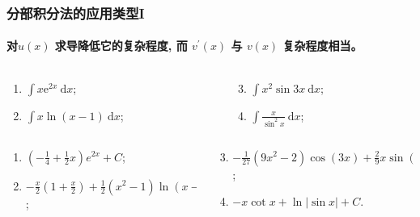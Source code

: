 \documentclass[
10pt,
aspectratio=43,
]{beamer}
\begin{document}
\begin{frame}
	\frametitle{分部积分法的应用类型I}
	\framesubtitle{对$u(x)$ 求导降低它的复杂程度, 而 $v^{\prime}(x)$ 与 $v(x)$ 复杂程度相当。}
	\everymath{\displaystyle}
	\begin{block}{}
		\begin{columns}[onlytextwidth]
			\begin{column}{0.5\textwidth}
				\begin{enumerate}
					\item $\int x \mathrm{e}^{2 x} \mathrm{~d} x$;
					\item $\int x \ln (x-1) \mathrm{~d} x$;
				\end{enumerate}
			\end{column}
			\begin{column}{0.5\textwidth}
				\begin{enumerate}
					\setcounter{enumi}{2}
					\item $\int x^2 \sin 3 x \mathrm{~d} x$;
					\item $\int \frac{x}{\sin ^2 x} \mathrm{~d} x$;
				\end{enumerate}
			\end{column}
		\end{columns}
	\end{block}
	\pause
	\begin{exampleblock}{}
		\begin{columns}[onlytextwidth]
			\begin{column}{0.5\textwidth}
				\begin{enumerate}
					\item $\left(-\frac{1}{4}+\frac{1}{2}x\right)e^{2x}+C$;
					\item $-\frac{x}{2}\left(1+\frac{x}{2}\right)+\frac{1}{2}\left(x^2-1\right)\ln(x-1)+C$;
				\end{enumerate}
			\end{column}
			\begin{column}{0.5\textwidth}
				\begin{enumerate}
					\setcounter{enumi}{2}
					\item $-\frac{1}{27} \left(9 x^2-2\right) \cos (3 x)+\frac{2}{9} x \sin (3 x)+C$;
					\item $-x\cot x+\ln|\sin x|+C$.
				\end{enumerate}
			\end{column}
		\end{columns}
	\end{exampleblock}
\end{frame}
\end{document}

